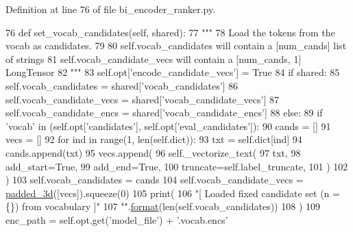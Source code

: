 Definition at line 76 of file bi\+\_\+encoder\+\_\+ranker.\+py.


\begin{DoxyCode}
76     \textcolor{keyword}{def }set\_vocab\_candidates(self, shared):
77         \textcolor{stringliteral}{"""}
78 \textcolor{stringliteral}{        Load the tokens from the vocab as candidates.}
79 \textcolor{stringliteral}{}
80 \textcolor{stringliteral}{        self.vocab\_candidates will contain a [num\_cands] list of strings}
81 \textcolor{stringliteral}{        self.vocab\_candidate\_vecs will contain a [num\_cands, 1] LongTensor}
82 \textcolor{stringliteral}{        """}
83         self.opt[\textcolor{stringliteral}{'encode\_candidate\_vecs'}] = \textcolor{keyword}{True}
84         \textcolor{keywordflow}{if} shared:
85             self.vocab\_candidates = shared[\textcolor{stringliteral}{'vocab\_candidates'}]
86             self.vocab\_candidate\_vecs = shared[\textcolor{stringliteral}{'vocab\_candidate\_vecs'}]
87             self.vocab\_candidate\_encs = shared[\textcolor{stringliteral}{'vocab\_candidate\_encs'}]
88         \textcolor{keywordflow}{else}:
89             \textcolor{keywordflow}{if} \textcolor{stringliteral}{'vocab'} \textcolor{keywordflow}{in} (self.opt[\textcolor{stringliteral}{'candidates'}], self.opt[\textcolor{stringliteral}{'eval\_candidates'}]):
90                 cands = []
91                 vecs = []
92                 \textcolor{keywordflow}{for} ind \textcolor{keywordflow}{in} range(1, len(self.dict)):
93                     txt = self.dict[ind]
94                     cands.append(txt)
95                     vecs.append(
96                         self.\_vectorize\_text(
97                             txt,
98                             add\_start=\textcolor{keyword}{True},
99                             add\_end=\textcolor{keyword}{True},
100                             truncate=self.label\_truncate,
101                         )
102                     )
103                 self.vocab\_candidates = cands
104                 self.vocab\_candidate\_vecs = \hyperlink{namespaceparlai_1_1utils_1_1misc_ad96b0c9ef6237d9ca051251089faf2c7}{padded\_3d}([vecs]).squeeze(0)
105                 print(
106                     \textcolor{stringliteral}{"[ Loaded fixed candidate set (n = \{\}) from vocabulary ]"}
107                     \textcolor{stringliteral}{""}.\hyperlink{namespaceparlai_1_1chat__service_1_1services_1_1messenger_1_1shared__utils_a32e2e2022b824fbaf80c747160b52a76}{format}(len(self.vocab\_candidates))
108                 )
109                 enc\_path = self.opt.get(\textcolor{stringliteral}{'model\_file'}) + \textcolor{stringliteral}{'.vocab.encs'}

\end{DoxyCode}
